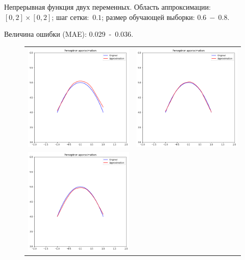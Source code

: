 \documentclass[12pt, a4paper]{article}
\begin{document}
    Непрерывная функция двух переменных. Область аппроксимации:~$[0, 2] \times [0, 2]$; шаг сетки:~$0.1$; размер обучающей выборки: $0.6~-~0.8$.
    
    Величина ошибки (MAE): 0.029~-~0.036.
    
    \begin{figure}[h]
        \center
        \begin{tabular}{cc}
            \includegraphics[width = 7cm]{f11_1_1.png}
            &
            \includegraphics[width = 7cm]{f11_1_2.png} \\
            \includegraphics[width = 7cm]{f11_1_3.png}

\end{tabular}
\end{figure}
\end{document}
